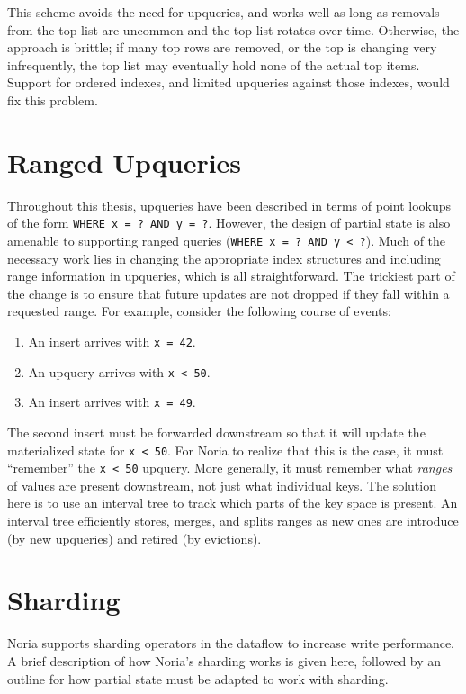 This scheme avoids the need for upqueries, and works well as long as removals
from the top list are uncommon and the top list rotates over time. Otherwise,
the approach is brittle; if many top rows are removed, or the top is changing
very infrequently, the top list may eventually hold none of the actual top
items. Support for ordered indexes, and limited upqueries against those indexes,
would fix this problem.

\section{Ranged Upqueries}

Throughout this thesis, upqueries have been described in terms of point lookups
of the form \texttt{WHERE x = ? AND y = ?}. However, the design of partial state
is also amenable to supporting ranged queries (\texttt{WHERE x = ? AND y < ?}).
Much of the necessary work lies in changing the appropriate index structures and
including range information in upqueries, which is all straightforward. The
trickiest part of the change is to ensure that future updates are not dropped if
they fall within a requested range. For example, consider the following course
of events:

\begin{enumerate}
  \item An insert arrives with \texttt{x = 42}.
  \item An upquery arrives with \texttt{x < 50}.
  \item An insert arrives with \texttt{x = 49}.
\end{enumerate}

The second insert must be forwarded downstream so that it will update the
materialized state for \texttt{x < 50}. For Noria to realize that this is the
case, it must ``remember'' the \texttt{x < 50} upquery. More generally, it must
remember what \emph{ranges} of values are present downstream, not just what
individual keys. The solution here is to use an interval tree to track which
parts of the key space is present. An interval tree efficiently stores, merges,
and splits ranges as new ones are introduce (by new upqueries) and retired (by
evictions).

\section{Sharding}

Noria supports sharding operators in the dataflow to increase write performance.
A brief description of how Noria's sharding works is given here, followed by an
outline for how partial state must be adapted to work with sharding.

